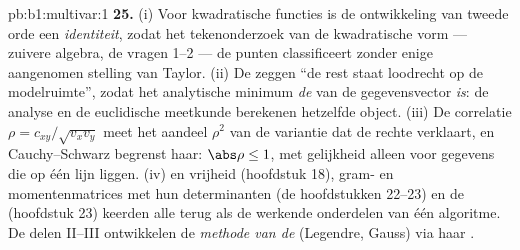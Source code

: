 \begin{solution}{pb:b1:multivar:1}
\textbf{25.} (i) Voor kwadratische functies is de ontwikkeling van
tweede orde een \emph{identiteit}, zodat het tekenonderzoek van de
kwadratische vorm --- zuivere algebra, de vragen 1--2 --- de
 punten classificeert zonder enige aangenomen stelling van
Taylor. (ii) De  zeggen ``de rest staat
loodrecht op de modelruimte'', zodat het analytische minimum
\emph{de}  van de gegevensvector \emph{is}: de
analyse en de euclidische meetkunde berekenen hetzelfde object.
(iii) De correlatie $\rho = c_{xy}/\sqrt{v_xv_y}$ meet het aandeel
$\rho^2$ van de variantie dat de rechte verklaart, en
Cauchy--Schwarz begrenst haar: $\abs\rho \leq 1$, met gelijkheid
alleen voor gegevens die op één lijn liggen. (iv)  en vrijheid
(hoofdstuk 18), gram- en momentenmatrices met hun determinanten
(de hoofdstukken 22--23) en de  (hoofdstuk 23)
keerden alle terug als de werkende onderdelen van één algoritme. De
delen II--III ontwikkelen de \emph{methode van de } (Legendre, Gauss) via haar
\emph{}.
\end{solution}

